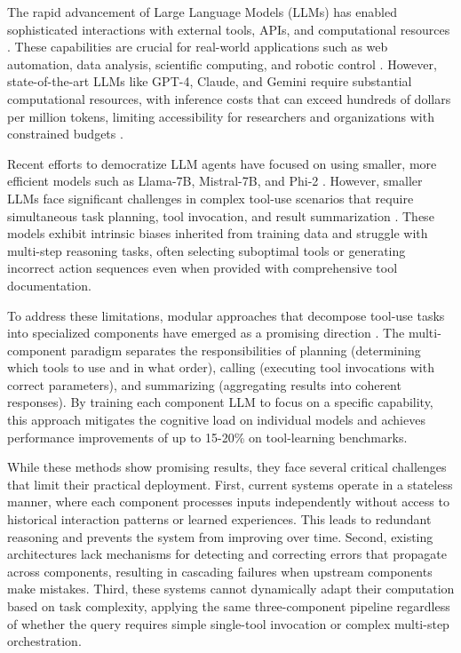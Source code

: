 \documentclass[conference]{IEEEtran}
\begin{document}
The rapid advancement of Large Language Models (LLMs) has enabled sophisticated interactions with external tools, APIs, and computational resources \cite{openai2023gpt4, touvron2023llama}. These capabilities are crucial for real-world applications such as web automation, data analysis, scientific computing, and robotic control \cite{schick2024toolformer, qin2023tool}. However, state-of-the-art LLMs like GPT-4, Claude, and Gemini require substantial computational resources, with inference costs that can exceed hundreds of dollars per million tokens, limiting accessibility for researchers and organizations with constrained budgets \cite{zhou2024lima}.

Recent efforts to democratize LLM agents have focused on using smaller, more efficient models such as Llama-7B, Mistral-7B, and Phi-2 \cite{touvron2023llama, jiang2023mistral}. However, smaller LLMs face significant challenges in complex tool-use scenarios that require simultaneous task planning, tool invocation, and result summarization \cite{shen2024small}. These models exhibit intrinsic biases inherited from training data and struggle with multi-step reasoning tasks, often selecting suboptimal tools or generating incorrect action sequences even when provided with comprehensive tool documentation.

To address these limitations, modular approaches that decompose tool-use tasks into specialized components have emerged as a promising direction \cite{shen2024small}. The multi-component paradigm separates the responsibilities of planning (determining which tools to use and in what order), calling (executing tool invocations with correct parameters), and summarizing (aggregating results into coherent responses). By training each component LLM to focus on a specific capability, this approach mitigates the cognitive load on individual models and achieves performance improvements of up to 15-20\% on tool-learning benchmarks.

While these methods show promising results, they face several critical challenges that limit their practical deployment. First, current systems operate in a stateless manner, where each component processes inputs independently without access to historical interaction patterns or learned experiences. This leads to redundant reasoning and prevents the system from improving over time. Second, existing architectures lack mechanisms for detecting and correcting errors that propagate across components, resulting in cascading failures when upstream components make mistakes. Third, these systems cannot dynamically adapt their computation based on task complexity, applying the same three-component pipeline regardless of whether the query requires simple single-tool invocation or complex multi-step orchestration.
\end{document}
